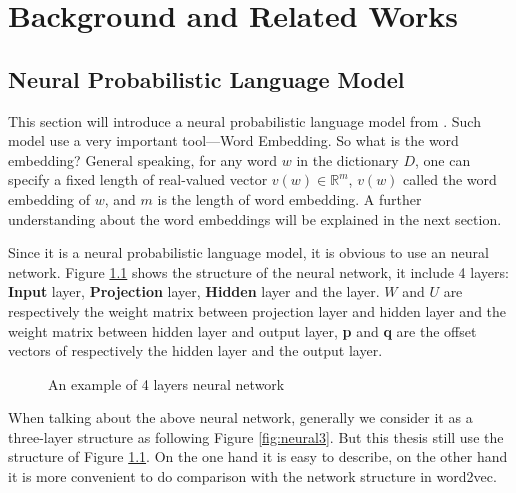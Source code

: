 \chapter{Background and Related Works}
\label{cha:embed}

\section{Neural Probabilistic Language Model} 
This section will introduce a neural probabilistic language model from \citep{bengio2003neural}. Such model use a very important tool---Word Embedding. So what is the word embedding? General speaking, for any word $w$ in the dictionary $D$, one can specify a fixed length of real-valued vector $v(w)\in \mathbb{R}^m$, $v(w)$ called the word embedding of $w$, and $m$ is the length of word embedding. A further understanding about the word embeddings will be explained in the next section. 

Since it is a neural probabilistic language model, it is obvious to use an neural network. Figure \ref{fig:neural4} shows the structure of the neural network, it include 4 layers: \textbf{Input} layer, \textbf{Projection} layer, \textbf{Hidden} layer and the  layer. $W$ and $U$ are respectively the weight matrix between projection layer and hidden layer and the weight matrix between hidden layer and output layer, \textbf{p} and \textbf{q} are the offset vectors of respectively the hidden layer and the output layer.
 
\begin{figure}[!ht]
  \centering
	\caption{An example of 4 layers neural network}
	\label{fig:neural4}
\end{figure}
 
When talking about the above neural network, generally we consider it as a three-layer structure as following Figure \ref{fig:neural3}. But this thesis still use the structure of Figure \ref{fig:neural4}. On the one hand it is easy to describe, on the other hand it is more convenient to do comparison with the network structure in word2vec.

